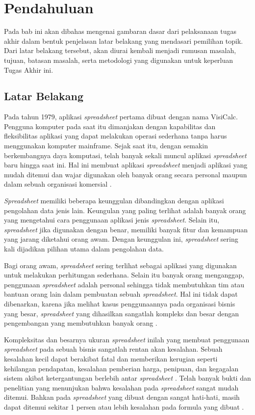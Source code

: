 \chapter{Pendahuluan}

Pada bab ini akan dibahas mengenai gambaran dasar dari pelaksanaan tugas akhir dalam bentuk penjelasan latar belakang yang mendasari pemilihan topik. Dari latar belakang tersebut, akan diurai kembali menjadi rumusan masalah, tujuan, batasan masalah, serta metodologi yang digunakan untuk keperluan Tugas Akhir ini.

\section{Latar Belakang}

Pada tahun 1979, aplikasi \textit{spreadsheet} pertama dibuat dengan nama VisiCalc. Pengguna komputer pada saat itu dimanjakan dengan kapabilitas dan fleksibilitas aplikasi yang dapat melakukan operasi sederhana tanpa harus menggunakan komputer mainframe. Sejak saat itu, dengan semakin berkembangnya daya komputasi, telah banyak sekali muncul aplikasi \textit{spreadsheet} baru hingga saat ini. Hal ini membuat aplikasi \textit{spreadsheet} menjadi aplikasi yang mudah ditemui dan wajar digunakan oleh banyak orang secara personal maupun dalam sebuah organisasi komersial \parencite{Chan1996}.

\textit{Spreadsheet} memiliki beberapa keunggulan dibandingkan dengan aplikasi pengolahan data jenis lain. Keungulan yang paling terlihat adalah banyak orang yang mengetahui cara penggunaan aplikasi jenis \textit{spreadsheet}. Selain itu, \textit{spreadsheet} jika digunakan dengan benar, memiliki banyak fitur dan kemampuan yang jarang diketahui orang awam. Dengan keunggulan ini, \textit{spreadsheet} sering kali dijadikan pilihan utama dalam pengolahan data.

Bagi orang awam, \textit{spreadsheet} sering terlihat sebagai aplikasi yang digunakan untuk melakukan perhitungan sederhana. Selain itu banyak orang menganggap, penggunaan \textit{spreadsheet} adalah personal sehingga tidak membutuhkan tim atau bantuan orang lain dalam pembuatan sebuah \textit{spreadsheet}. Hal ini tidak dapat dibenarkan, karena jika melihat kasus penggunaannya pada organisasi bisnis yang besar, \textit{spreadsheet} yang dihasilkan sangatlah kompleks dan besar dengan pengembangan yang membutuhkan banyak orang \parencite{Panko1998}.

Kompleksitas dan besarnya ukuran \textit{spreadsheet} inilah yang membuat penggunaan \textit{spreadsheet} pada sebuah bisnis sangatlah rentan akan kesalahan. Sebuah kesalahan kecil dapat berakibat fatal dan memberikan kerugian seperti kehilangan pendapatan, kesalahan pemberian harga, penipuan, dan kegagalan sistem akibat ketergantungan berlebih antar \textit{spreadsheet} \parencite{EUSPRIGAbout}. Telah banyak bukti dan penelitian yang menunjukan bahwa kesalahan pada \textit{spreadsheet} sangat mudah ditemui. Bahkan pada \textit{spreadsheet} yang dibuat dengan sangat hati-hati, masih dapat ditemui sekitar 1 persen atau lebih kesalahan pada formula yang dibuat \parencite{Panko1998}.

